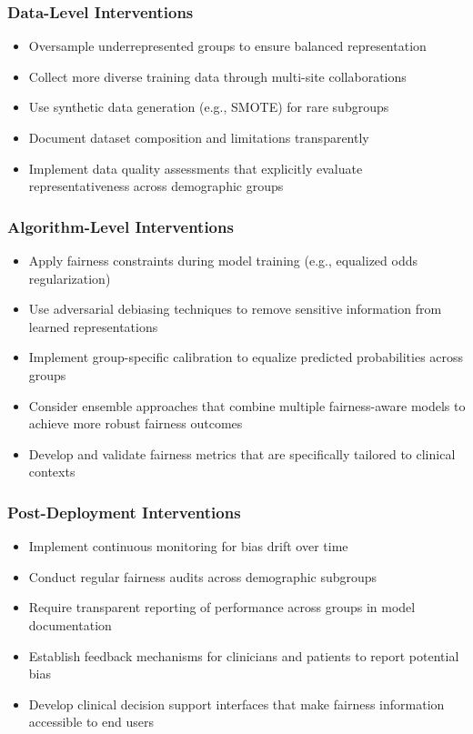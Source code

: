 \subsubsection{Data-Level Interventions}
\begin{itemize}[leftmargin=*]
    \item Oversample underrepresented groups to ensure balanced representation
    \item Collect more diverse training data through multi-site collaborations
    \item Use synthetic data generation (e.g., SMOTE) for rare subgroups
    \item Document dataset composition and limitations transparently
    \item Implement data quality assessments that explicitly evaluate 
          representativeness across demographic groups
\end{itemize}

\subsubsection{Algorithm-Level Interventions}
\begin{itemize}[leftmargin=*]
    \item Apply fairness constraints during model training (e.g., equalized 
          odds regularization)
    \item Use adversarial debiasing techniques to remove sensitive information 
          from learned representations
    \item Implement group-specific calibration to equalize predicted 
          probabilities across groups
    \item Consider ensemble approaches that combine multiple fairness-aware 
          models to achieve more robust fairness outcomes
    \item Develop and validate fairness metrics that are specifically 
          tailored to clinical contexts
\end{itemize}

\subsubsection{Post-Deployment Interventions}
\begin{itemize}[leftmargin=*]
    \item Implement continuous monitoring for bias drift over time
    \item Conduct regular fairness audits across demographic subgroups
    \item Require transparent reporting of performance across groups in 
          model documentation
    \item Establish feedback mechanisms for clinicians and patients to 
          report potential bias
    \item Develop clinical decision support interfaces that make fairness 
          information accessible to end users
\end{itemize}

